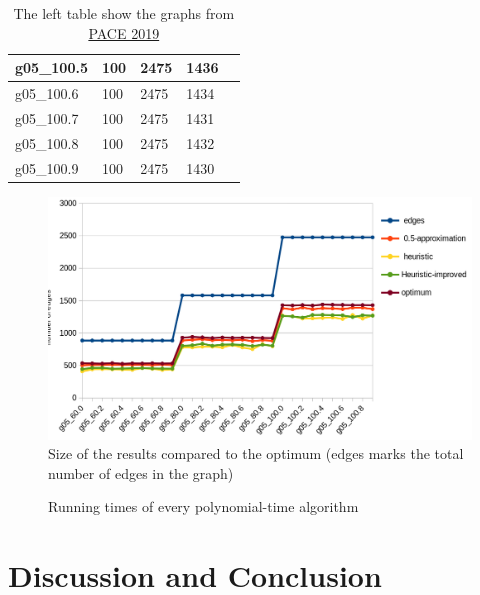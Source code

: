 \documentclass[twocolumn]{article}
\begin{document}
\begin{table}[!ht]
\begin{tabular}{|l|l|l|l|l|}
        g05\_100.5 & 100 & 2475 & 1436 \\ \hline
        g05\_100.6 & 100 & 2475 & 1434 \\ \hline
        g05\_100.7 & 100 & 2475 & 1431 \\ \hline
        g05\_100.8 & 100 & 2475 & 1432 \\ \hline
        g05\_100.9 & 100 & 2475 & 1430 \\ \hline
    \end{tabular}
    \caption{The left table show the graphs from \href{https://pacechallenge.org/2019/vc/vc_exact/}{PACE 2019}}
    \label{tbl:graph}
\end{table}

\begin{figure}
  \begin{center}
    \includegraphics[height=0.4\textheight]{figures/solution_size.png}
  \end{center}
  \caption{Size of the results compared to the optimum (edges marks the total number of edges in the graph)}
  \label{fig:size}
\end{figure}

\begin{figure}
  \begin{center}
    
  \end{center}
  \caption{Running times of every polynomial-time algorithm}
  \label{fig:run_time}
\end{figure}



\section{Discussion and Conclusion}
\end{document}
